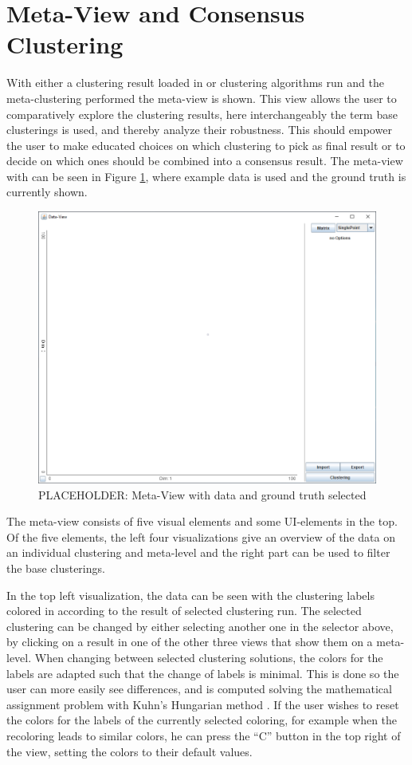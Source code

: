 \documentclass[
	a4paper,
	english,
	twoside,
	openright,               
	11pt                            
	]{report}
\begin{document}
\section{Meta-View and Consensus Clustering}
With either a clustering result loaded in or clustering algorithms run and the meta-clustering performed the meta-view is shown. This view allows the user to comparatively explore the clustering results, here interchangeably the term base clusterings is used, and thereby analyze their robustness. This should empower the user to make educated choices on which clustering to pick as final result or to decide on which ones should be combined into a consensus result. The meta-view with can be seen in Figure \ref{fig:meta-view}, where example data is used and the ground truth is currently shown.

\begin{figure}[h]
	\centering
	\includegraphics[scale=.45]{data-view}
	\caption{PLACEHOLDER: Meta-View with data and ground truth selected}
	\label{fig:meta-view}
\end{figure}

The meta-view consists of five visual elements and some UI-elements in the top. Of the five elements, the left four visualizations give an overview of the data on an individual clustering and meta-level and the right part can be used to filter the base clusterings. 

In the top left visualization, the data can be seen with the clustering labels colored in according to the result of selected clustering run. The selected clustering can be changed by either selecting another one in the selector above, by clicking on a result in one of the other three views that  show them on a meta-level. When changing between selected clustering solutions, the colors for the labels are adapted such that the change of labels is minimal. This is done so the user can more easily see differences, and is computed solving the mathematical assignment problem with Kuhn’s Hungarian method \cite{Kuhn2010}. If the user wishes to reset the colors for the labels of the currently selected coloring, for example when the recoloring leads to similar colors, he can press the ``C'' button in the top right of the view, setting the colors to their default values.
\end{document}

